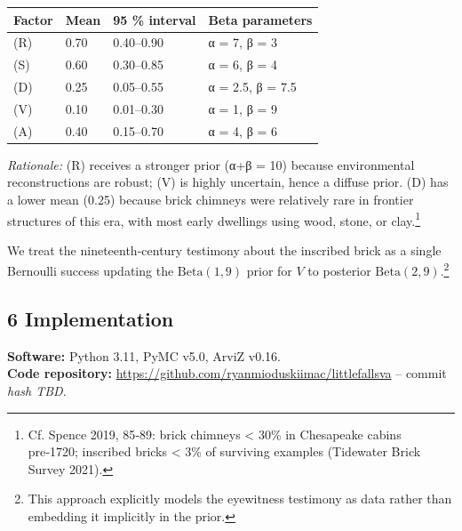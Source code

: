 \documentclass[
  11pt,
]{article}
\begin{document}
\begin{longtable}[]{@{}llll@{}}
\toprule\noalign{}
Factor & Mean & 95 \% interval & Beta parameters \\
\midrule\noalign{}
\endhead
\bottomrule\noalign{}
\endlastfoot
(R) & 0.70 & 0.40--0.90 & α = 7, β = 3 \\
(S) & 0.60 & 0.30--0.85 & α = 6, β = 4 \\
(D) & 0.25 & 0.05--0.55 & α = 2.5, β = 7.5 \\
(V) & 0.10 & 0.01--0.30 & α = 1, β = 9 \\
(A) & 0.40 & 0.15--0.70 & α = 4, β = 6 \\
\end{longtable}

\emph{Rationale:} (R) receives a stronger prior (α+β = 10) because
environmental reconstructions are robust; (V) is highly uncertain, hence
a diffuse prior. (D) has a lower mean (0.25) because brick chimneys were
relatively rare in frontier structures of this era, with most early
dwellings using wood, stone, or clay.\footnote{Cf. Spence 2019, 85‑89:
  brick chimneys \textless{} 30\% in Chesapeake cabins pre‑1720;
  inscribed bricks \textless{} 3\% of surviving examples (Tidewater
  Brick Survey 2021).}

We treat the nineteenth-century testimony about the inscribed brick as a
single Bernoulli success updating the \(\text{Beta}(1,9)\) prior for
\(V\) to posterior \(\text{Beta}(2,9)\).\footnote{This approach
  explicitly models the eyewitness testimony as data rather than
  embedding it implicitly in the prior.}

\subsection{6 Implementation}\label{implementation}

\textbf{Software:} Python 3.11, PyMC v5.0, ArviZ v0.16.\\
\textbf{Code repository:}
\url{https://github.com/ryanmioduskiimac/littlefallsva} -- commit
\emph{hash TBD}.
\end{document}
